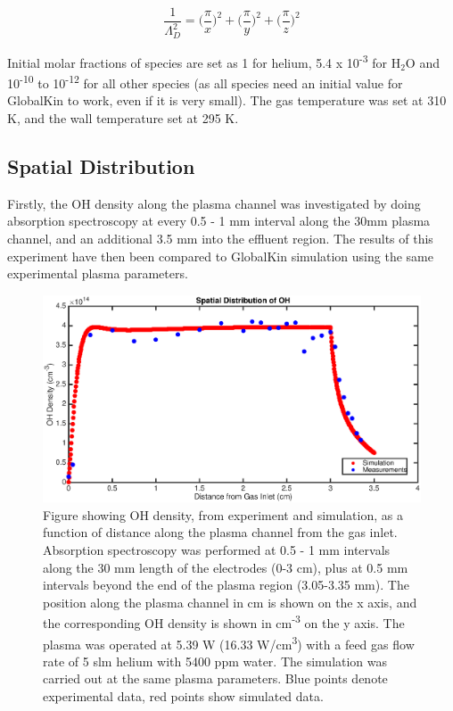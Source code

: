 \documentclass[11pt, oneside]{article}   	%
\begin{document}
\begin{equation}
\frac{1}{\Lambda_D^2} = \Big(\frac{\pi}{x}\Big)^2 + \Big(\frac{\pi}{y}\Big)^2 + \Big(\frac{\pi}{z}\Big)^2
\end{equation}

Initial molar fractions of species are set as 1 for helium, 5.4 x 10\textsuperscript{-3} for H$_2$O and 10\textsuperscript{-10} to 10\textsuperscript{-12} for all other species (as all species need an initial value for GlobalKin to work, even if it is very small). 
The gas temperature was set at 310 K, and the wall temperature set at 295 K.


\subsection{Spatial Distribution}

Firstly, the OH density along the plasma channel was investigated by doing absorption spectroscopy at every 0.5 - 1 mm interval along the 30mm plasma channel, and an additional 3.5 mm into the effluent region.
The results of this experiment have then been compared to GlobalKin simulation using the same experimental plasma parameters.

\begin{figure}
\includegraphics[width=\textwidth]{Figures/SpatialGraph}
\caption{
Figure showing OH density, from experiment and simulation, as a function of distance along the plasma channel from the gas inlet. Absorption spectroscopy was performed at 0.5 - 1 mm intervals along the 30 mm length of the electrodes (0-3 cm), plus at 0.5 mm intervals beyond the end of the plasma region (3.05-3.35 mm). The position along the plasma channel in cm is shown on the x axis, and the corresponding OH density is shown in cm\textsuperscript{-3} on the y axis. The plasma was operated at 5.39 W (16.33 W/cm\textsuperscript{3}) with a feed gas flow rate of 5 slm helium with 5400 ppm water. 
The simulation was carried out at the same plasma parameters.
Blue points denote experimental data, red points show simulated data.}
\label{SpatialGraph}
\end{figure}
\end{document}
